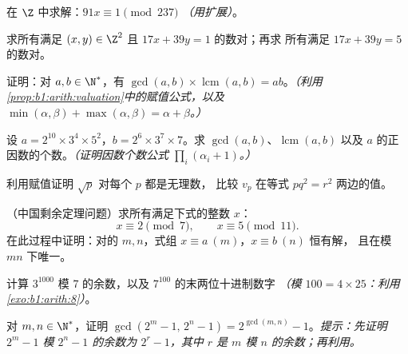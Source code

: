 \begin{exercise}[$\star$]\label{exo:b1:arith:3}
在 $\Z$ 中求解：$91x \equiv 1 \pmod{237}$ \emph{（用扩展）}。
\end{exercise}

\begin{exercise}[$\star$]\label{exo:b1:arith:4}
求所有满足 $(x, y) \in \Z^2$ 且 $17x + 39y = 1$ 的数对；再求
所有满足 $17 x + 39 y = 5$ 的数对。
\end{exercise}

\begin{exercise}[$\star\star$]\label{exo:b1:arith:5}
证明：对 $a, b \in \N^*$，有 $\gcd(a,b) \times
\operatorname{lcm}(a,b) = ab$。\emph{（利用
\cref{prop:b1:arith:valuation}中的赋值公式，以及 $\min(\alpha,\beta) +
\max(\alpha,\beta) = \alpha + \beta$。）}
\end{exercise}

\begin{exercise}[$\star\star$]\label{exo:b1:arith:6}
设 $a = 2^{10} \times 3^4 \times 5^2$，$b = 2^6 \times 3^7 \times
7$。求 $\gcd(a, b)$、$\operatorname{lcm}(a,b)$ 以及
$a$ 的正因数的个数。\emph{（证明因数个数公式
$\prod_i (\alpha_i + 1)$。）}
\end{exercise}

\begin{exercise}[$\star\star$]\label{exo:b1:arith:7}
利用赋值证明 $\sqrt p$ 对每个 $p$ 都是无理数，
比较 $v_p$ 在等式 $p q^2 = r^2$ 两边的值。
\end{exercise}

\begin{exercise}[$\star\star$]\label{exo:b1:arith:8}
（中国剩余定理问题）求所有满足下式的整数 $x$：
\[
x \equiv 2 \pmod 7, \qquad x \equiv 5 \pmod{11}.
\]
在此过程中证明：对的 $m, n$，式组
$x \equiv a \ (m)$，$x \equiv b\ (n)$ 恒有解，
且在模 $mn$ 下唯一。
\end{exercise}

\begin{exercise}[$\star\star$]\label{exo:b1:arith:9}
计算 $3^{1000}$ 模 $7$ 的余数，以及
$7^{100}$ 的末两位十进制数字 \emph{（模 $100 = 4 \times 25$：利用
\cref{exo:b1:arith:8}）}。
\end{exercise}

\begin{exercise}[$\star\star\star$]\label{exo:b1:arith:10}
对 $m, n \in \N^*$，证明 $\gcd(2^m - 1,\, 2^n - 1) =
2^{\gcd(m,n)} - 1$。\emph{提示：先证明 $2^m
- 1$ 模 $2^n - 1$ 的余数为 $2^r - 1$，其中 $r$ 是 $m$
模 $n$ 的余数；再利用。}
\end{exercise}

